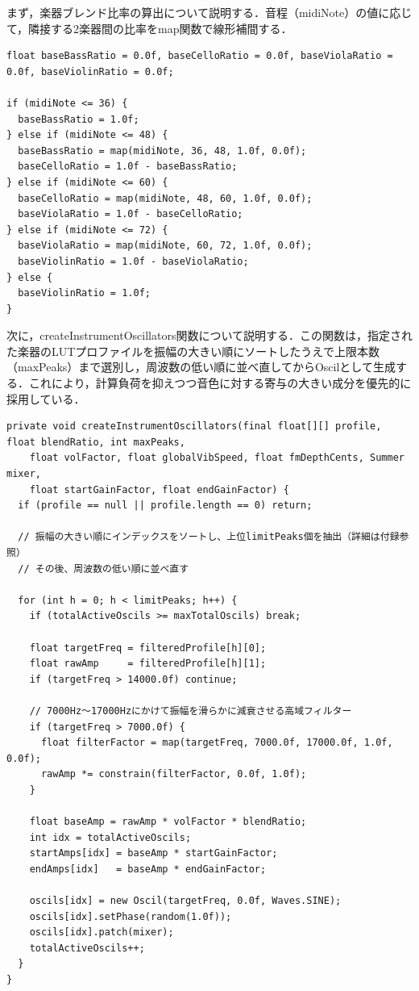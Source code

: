まず，楽器ブレンド比率の算出について説明する．音程（midiNote）の値に応じて，隣接する2楽器間の比率をmap関数で線形補間する．

\begin{lstlisting}[caption={StringsInstrumentコンストラクタ（楽器ブレンド比率の算出）}, label={lst:gakki_strings_blend}]
float baseBassRatio = 0.0f, baseCelloRatio = 0.0f, baseViolaRatio = 0.0f, baseViolinRatio = 0.0f;

if (midiNote <= 36) {
  baseBassRatio = 1.0f;
} else if (midiNote <= 48) {
  baseBassRatio = map(midiNote, 36, 48, 1.0f, 0.0f);
  baseCelloRatio = 1.0f - baseBassRatio;
} else if (midiNote <= 60) {
  baseCelloRatio = map(midiNote, 48, 60, 1.0f, 0.0f);
  baseViolaRatio = 1.0f - baseCelloRatio;
} else if (midiNote <= 72) {
  baseViolaRatio = map(midiNote, 60, 72, 1.0f, 0.0f);
  baseViolinRatio = 1.0f - baseViolaRatio;
} else {
  baseViolinRatio = 1.0f;
}
\end{lstlisting}

次に，createInstrumentOscillators関数について説明する．この関数は，指定された楽器のLUTプロファイルを振幅の大きい順にソートしたうえで上限本数（maxPeaks）まで選別し，周波数の低い順に並べ直してからOscilとして生成する．これにより，計算負荷を抑えつつ音色に対する寄与の大きい成分を優先的に採用している．

\begin{lstlisting}[caption={StringsInstrument::createInstrumentOscillators関数（要部）}, label={lst:gakki_strings_create}]
private void createInstrumentOscillators(final float[][] profile, float blendRatio, int maxPeaks,
    float volFactor, float globalVibSpeed, float fmDepthCents, Summer mixer,
    float startGainFactor, float endGainFactor) {
  if (profile == null || profile.length == 0) return;

  // 振幅の大きい順にインデックスをソートし、上位limitPeaks個を抽出（詳細は付録参照）
  // その後、周波数の低い順に並べ直す

  for (int h = 0; h < limitPeaks; h++) {
    if (totalActiveOscils >= maxTotalOscils) break;

    float targetFreq = filteredProfile[h][0];
    float rawAmp     = filteredProfile[h][1];
    if (targetFreq > 14000.0f) continue;

    // 7000Hz〜17000Hzにかけて振幅を滑らかに減衰させる高域フィルター
    if (targetFreq > 7000.0f) {
      float filterFactor = map(targetFreq, 7000.0f, 17000.0f, 1.0f, 0.0f);
      rawAmp *= constrain(filterFactor, 0.0f, 1.0f);
    }

    float baseAmp = rawAmp * volFactor * blendRatio;
    int idx = totalActiveOscils;
    startAmps[idx] = baseAmp * startGainFactor;
    endAmps[idx]   = baseAmp * endGainFactor;

    oscils[idx] = new Oscil(targetFreq, 0.0f, Waves.SINE);
    oscils[idx].setPhase(random(1.0f));
    oscils[idx].patch(mixer);
    totalActiveOscils++;
  }
}
\end{lstlisting}

